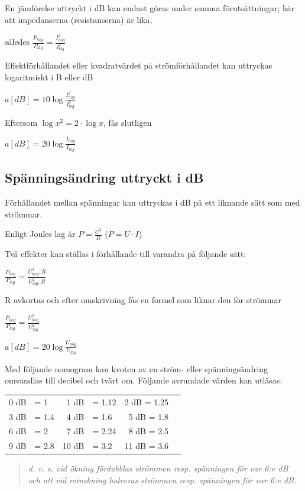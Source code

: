 En jämförelse uttryckt i dB kan endast göras
under samma förutsättningar; här att impedanserna (resistanserna) är lika,

således \(\frac{P_{hög}}{P_{låg}} = \frac{I_{hög}^2}{I_{låg}^2}\)

Effektförhållandet eller kvadratvärdet på
strömförhållandet kan uttryckas logaritmiskt
i B eller dB

\(a[dB] = 10\log \frac{I_{hog}^2}{I_{log}^2}\)

Eftersom \(\log x^2 = 2 \cdot \log x\), fås slutligen

\(a[dB] = 20\log \frac{I_{hög}}{I_{låg}}\)

\subsection{Spänningsändring uttryckt i dB}

Förhållandet mellan spänningar kan uttryckas i dB på ett liknande sätt som med
strömmar.

Enligt Joules lag är \(P = \frac{U^2}{R}\) (\(P = U \cdot I\))

Två effekter kan ställas i förhållande till varandra på följande sätt:

\(\frac{P_{hög}}{P_{låg}}=\frac{U_{hög}^2:R}{U_{låg}^2:R}\)

R avkortas och efter omskrivning fås en formel som liknar den för strömmar

\(\frac{P_{hög}}{P_{låg}} = \frac{U_{hög}^2}{U_{låg}^2}\)

\(a[dB] = 20\log \frac{U_{hög}}{U_{låg}}\)

Med följande nomogram kan kvoten av en ström- eller spänningsändring omvandlas
till decibel och tvärt om.
Följande avrundade värden kan utläsas:

\begin{tabular}{rlrlrl}
0 dB & = 1   &  1 dB & = 1.12 &  2 dB = 1.25 \\
3 dB & = 1.4 &  4 dB & = 1.6  &  5 dB = 1.8 \\
6 dB & = 2   &  7 dB & = 2.24 &  8 dB = 2.5 \\
9 dB & = 2.8 & 10 dB & = 3.2  & 11 dB = 3.6
\end{tabular}

\begin{quote}\emph{
d. v. s. vid ökning fördubblas strömmen resp. spänningen för var 6:e dB och att
vid minskning halveras strömmen resp. spänningen för var 6:e dB.
}\end{quote}

